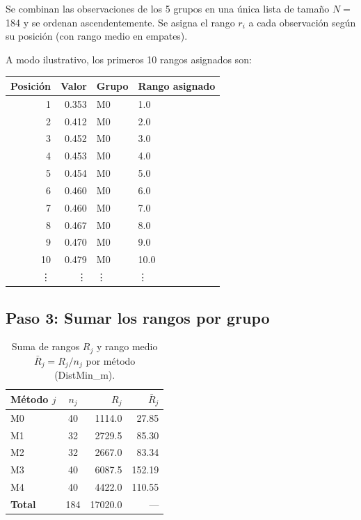 \documentclass[12pt,a4paper,oneside]{book}
\begin{document}
Se combinan las observaciones de los 5 grupos en una única lista de tamaño $N=$ 184 y se ordenan ascendentemente. Se asigna el rango $r_i$ a cada observación según su posición (con rango medio en empates).

A modo ilustrativo, los primeros 10 rangos asignados son:

\begin{table}[H]
\centering
\begin{tabular}{rrll}
\toprule
\textbf{Posición} & \textbf{Valor} & \textbf{Grupo} & \textbf{Rango asignado} \\
\midrule
1 & 0.353 & M0 & 1.0 \\
2 & 0.412 & M0 & 2.0 \\
3 & 0.452 & M0 & 3.0 \\
4 & 0.453 & M0 & 4.0 \\
5 & 0.454 & M0 & 5.0 \\
6 & 0.460 & M0 & 6.0 \\
7 & 0.460 & M0 & 7.0 \\
8 & 0.467 & M0 & 8.0 \\
9 & 0.470 & M0 & 9.0 \\
10 & 0.479 & M0 & 10.0 \\
\vdots & \vdots & \vdots & \vdots \\
\bottomrule
\end{tabular}
\end{table}

\subsection{Paso 3: Sumar los rangos por grupo}

\begin{table}[H]
\centering
\caption{Suma de rangos $R_j$ y rango medio $\bar{R}_j = R_j/n_j$ por método (DistMin\_m).}
\begin{tabular}{lcrr}
\toprule
\textbf{Método $j$} & $n_j$ & $R_j$ & $\bar{R}_j$ \\
\midrule
M0 & 40 & 1114.0 & 27.85 \\
M1 & 32 & 2729.5 & 85.30 \\
M2 & 32 & 2667.0 & 83.34 \\
M3 & 40 & 6087.5 & 152.19 \\
M4 & 40 & 4422.0 & 110.55 \\
\midrule
\textbf{Total} & 184 & 17020.0 & --- \\
\bottomrule
\end{tabular}
\end{table}
\end{document}
